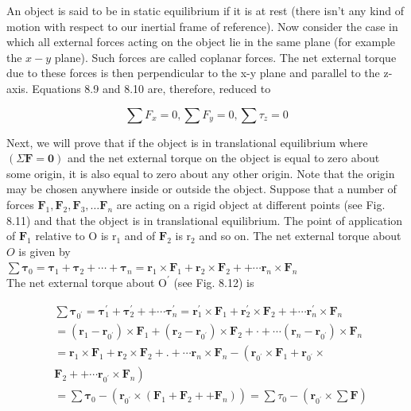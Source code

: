 \documentclass[10pt]{article}
\begin{document}
An object is said to be in static equilibrium if it is at rest (there isn't any kind of motion with respect to our inertial frame of reference). Now consider the case in which all external forces acting on the object lie in the same plane (for example the $x-y$ plane). Such forces are called coplanar forces. The net external torque due to these forces is then perpendicular to the x-y plane and parallel to the z-axis. Equations 8.9 and 8.10 are, therefore, reduced to

$$
\sum F_{x}=0, \sum F_{y}=0, \sum \tau_{z}=0
$$

Next, we will prove that if the object is in translational equilibrium where $(\Sigma \mathbf{F}=\mathbf{0})$ and the net external torque on the object is equal to zero about some origin, it is also equal to zero about any other origin. Note that the origin may be chosen anywhere inside or outside the object. Suppose that a number of forces $\mathbf{F}_{1}, \mathbf{F}_{2}, \mathbf{F}_{3}, \ldots \mathbf{F}_{n}$ are acting on a rigid object at different points (see Fig. 8.11) and that the object is in translational equilibrium. The point of application of $\mathbf{F}_{1}$ relative to O is $\mathrm{r}_{1}$ and of $\mathbf{F}_{2}$ is $\mathrm{r}_{2}$ and so on. The net external torque about $O$ is given by\\
$\sum \boldsymbol{\tau}_{0}=\boldsymbol{\tau}_{1}+\boldsymbol{\tau}_{2}+\cdots+\boldsymbol{\tau}_{n}=\mathbf{r}_{1} \times \mathbf{F}_{1}+\mathbf{r}_{2} \times \mathbf{F}_{2}++\cdots \mathbf{r}_{n} \times \mathbf{F}_{n}$\\
The net external torque about $\mathrm{O}^{\prime}$ (see Fig. 8.12) is

$$
\begin{aligned}
& \sum \boldsymbol{\tau}_{0^{\prime}}=\boldsymbol{\tau}_{1}^{\prime}+\boldsymbol{\tau}_{2}^{\prime}++\cdots \boldsymbol{\tau}_{n}^{\prime}=\mathbf{r}_{1}^{\prime} \times \mathbf{F}_{1}+\mathbf{r}_{2}^{\prime} \times \mathbf{F}_{2}++\cdots \mathbf{r}_{n}^{\prime} \times \mathbf{F}_{n} \\
& =\left(\mathbf{r}_{1}-\mathbf{r}_{0^{\prime}}\right) \times \mathbf{F}_{1}+\left(\mathbf{r}_{2}-\mathbf{r}_{0^{\prime}}\right) \times \mathbf{F}_{2}+\cdot+\cdots\left(\mathbf{r}_{n}-\mathbf{r}_{0^{\prime}}\right) \times \mathbf{F}_{n} \\
& =\mathbf{r}_{1} \times \mathbf{F}_{1}+\mathbf{r}_{2} \times \mathbf{F}_{2}+.+\cdots \mathbf{r}_{n} \times \mathbf{F}_{n}-\left(\mathbf{r}_{0^{\prime}} \times \mathbf{F}_{1}+\mathbf{r}_{0^{\prime}} \times\right. \\
& \left.\mathbf{F}_{2}++\cdots \mathbf{r}_{0^{\prime}} \times \mathbf{F}_{n}\right) \\
& =\sum \boldsymbol{\tau}_{0}-\left(\mathbf{r}_{0^{\prime}} \times\left(\mathbf{F}_{1}+\mathbf{F}_{2}++\mathbf{F}_{n}\right)\right)=\sum \tau_{0}-\left(\mathbf{r}_{0^{\prime}} \times \sum \mathbf{F}\right)
\end{aligned}
$$
\end{document}
